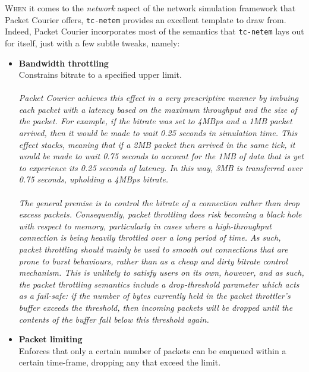 \lettrine{W}{hen} it comes to the \emph{network} aspect of the network simulation framework that Packet Courier offers,
\texttt{tc-netem}\cite{tc_netem_wiki, tc_netem_8_man,tc_netem_src} provides an excellent template to draw from.
Indeed, Packet Courier incorporates most of the semantics that \texttt{tc-netem} lays out for itself, just with a few
subtle tweaks, namely:
\begin{itemize}
    \item \textbf{Bandwidth throttling} \\
    Constrains bitrate to a specified upper limit. \\ \\
    \emph{Packet Courier achieves this effect in a very prescriptive manner by imbuing each packet with a latency
    based on the maximum throughput and the size of the packet. For example, if the bitrate was set to 4MBps and a
    1MB packet arrived, then it would be made to wait 0.25 seconds in simulation time. This effect stacks, meaning
    that if a 2MB packet then arrived in the same tick, it would be made to wait 0.75 seconds to account for the 1MB
    of data that is yet to experience its 0.25 seconds of latency. In this way, 3MB is transferred over 0.75 seconds,
        upholding a 4MBps bitrate. \\ \\
        The general premise is to control the bitrate of a connection rather than drop excess packets. Consequently,
        packet throttling does risk becoming a black hole with respect to memory, particularly in cases where a
        high-throughput connection is being heavily throttled over a long period of time. As such, packet throttling
        should mainly be used to smooth out connections that are prone to burst behaviours, rather than as a cheap
        and dirty bitrate control mechanism. This is unlikely to satisfy users on its own, however, and as such, the
        packet throttling semantics include a drop-threshold parameter which acts as a fail-safe: if the number of
        bytes currently held in the packet throttler's buffer exceeds the threshold, then incoming packets will be
        dropped until the contents of the buffer fall below this threshold again.}
    \item \textbf{Packet limiting} \\
    Enforces that only a certain number of packets can be enqueued within a certain time-frame, dropping any that
    exceed the limit. \\ \\

\end{itemize}
